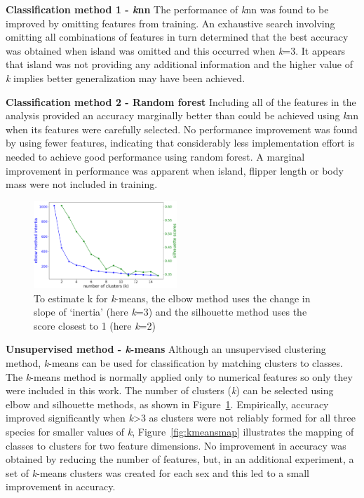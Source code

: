 \documentclass[12pt]{article}
\begin{document}
\textbf{Classification method 1 - \textit{k}nn}  
The performance of \textit{k}nn was found to be improved by omitting features from training. 
An exhaustive search involving omitting all combinations of features in turn determined that the best accuracy was obtained 
when island was omitted and this occurred when \textit{k}=3. It appears that island was not providing any additional information 
and the higher value of \textit{k} implies better generalization may have been achieved.

\textbf{Classification method 2 - Random forest}  
Including all of the features in the analysis provided an accuracy marginally better 
than could be achieved using \textit{k}nn when its features were carefully selected. 
No performance improvement was found by using fewer features, indicating that 
considerably less implementation effort is needed to achieve good performance using random forest. 
A marginal improvement in performance was apparent when island, flipper length or body mass were not included in training.

\begin{figure} %
  \centering
  \vspace{-0.5\baselineskip} %
  \includegraphics[width=0.48\textwidth]{kmeansvalue.png} %
  \vspace{-0.5\baselineskip} %
  \caption{To estimate k for \textit{k}-means, the elbow method uses the change in slope of `inertia' 
  (here \textit{k}=3) and the silhouette method uses the score closest to 1 (here \textit{k}=2)}
  \vspace{-0.5\baselineskip} %
  \label{fig:kmeansvalue}
\end{figure}

\textbf{Unsupervised method - \textit{k}-means}  
Although an unsupervised clustering method, 
\textit{k}-means can be used for classification by matching clusters to classes. 
The \textit{k}-means method is normally applied only to numerical features so only they were included in this work. 
The number of clusters (\textit{k}) can be selected using elbow and silhouette methods, 
as shown in Figure~\ref{fig:kmeansvalue}. Empirically, accuracy improved significantly when \textit{k}>3 
as clusters were not reliably formed for all three species for smaller values of \textit{k},  
Figure~\ref{fig:kmeansmap} illustrates the mapping of classes to clusters for two feature dimensions. 
No improvement in accuracy was obtained by reducing the number of features, 
but, in an additional experiment, a set of \textit{k}-means clusters was created for each sex 
and this led to a small improvement in accuracy. 
\end{document}
